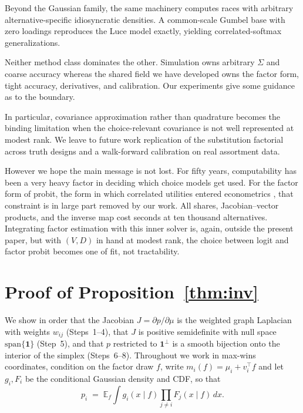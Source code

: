 \documentclass[12pt]{article}
\theoremstyle{remark}
\newcommand{\E}{\mathbb{E}}
\begin{document}
Beyond the Gaussian family, the same machinery computes races with arbitrary
alternative-specific idiosyncratic densities. A common-scale Gumbel base with
zero loadings reproduces the Luce model exactly, yielding correlated-softmax
generalizations.

Neither method class dominates the other. Simulation owns arbitrary
$\Sigma$ and coarse accuracy whereas the shared field we have developed owns the factor form,
tight accuracy, derivatives, and calibration. Our experiments give some guidance as to the boundary. 

In particular, covariance approximation rather than quadrature
becomes the binding limitation when the choice-relevant covariance is
not well represented at modest rank. We leave to future work
replication of the substitution factorial across truth designs and a
walk-forward calibration on real assortment data.

However we hope the main message is not lost. For fifty years, computability has been a very heavy factor in deciding which choice models get used. For
the factor form of probit, the form in which correlated utilities entered
econometrics \citep{hausman1978}, that constraint is in large part removed by our work. All shares, Jacobian--vector products, and
the inverse map cost seconds at ten thousand alternatives. Integrating
factor estimation with this inner solver is, again, outside the present paper,
but with $(V, D)$ in hand at modest rank, the choice between logit and
factor probit becomes one of fit, not tractability.

\appendix
\section{Proof of Proposition~\ref{thm:inv}}\label{app:inv}

We show in order that the Jacobian $J = \partial p/\partial\mu$ is the
weighted graph Laplacian with weights $w_{ij}$ (Steps~1--4), that $J$ is
positive semidefinite with null space $\mathrm{span}\{\mathbf{1}\}$
(Step~5), and that $p$ restricted to $\mathbf{1}^\perp$ is a smooth
bijection onto the interior of the simplex (Steps~6--8). Throughout we
work in max-wins coordinates, condition on the factor draw $f$, write
$m_i(f) = \mu_i + v_i^\top f$ and let $g_i, F_i$ be the conditional
Gaussian density and CDF, so that
\[
p_i \;=\; \E_f \int g_i(x\mid f)\prod_{j\ne i} F_j(x\mid f)\,dx .
\]
\end{document}
